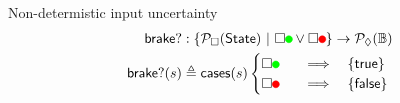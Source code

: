 \documentclass[14pt]{beamer}
\newcommand{\PLower}{\mathcal{P}_\lozenge}
\newcommand{\PUpper}{\mathcal{P}_\square}
\newcommand{\State}{\mathsf{State}}
\newcommand{\suchthat}{\ |\ }
\newcommand{\bool}{\mathbb{B}}
\newcommand*{\tikzbullet}[2]{%
  \setbox0=\hbox{\strut}%
  \begin{tikzpicture}
    \useasboundingbox (-.25em,0) rectangle (.25em,\ht0);
    \filldraw[draw=#1,fill=#2] (0,0.3\ht0) circle[radius=.25em];
  \end{tikzpicture}%
}
\newcommand{\SafeToGo}{\tikzbullet{green}{green}}
\newcommand{\SafeToStop}{\tikzbullet{red}{red}}
\begin{document}
\begin{frame}{Non-determistic input uncertainty}
\begin{align*}
\mathsf{brake?} &: \{ \PUpper(\State) \suchthat \square \SafeToGo \vee \square \SafeToStop \} \to \PLower(\bool)
\\ \mathsf{brake?}(s) &\triangleq \mathsf{cases}(s)
\begin{cases}
\square \SafeToGo
  \quad &\Longrightarrow \quad
  \{ \mathsf{true} \}
\\
\square \SafeToStop
  \quad &\Longrightarrow \quad
  \{ \mathsf{false} \}
\end{cases}
\end{align*}
\end{frame}
\end{document}
